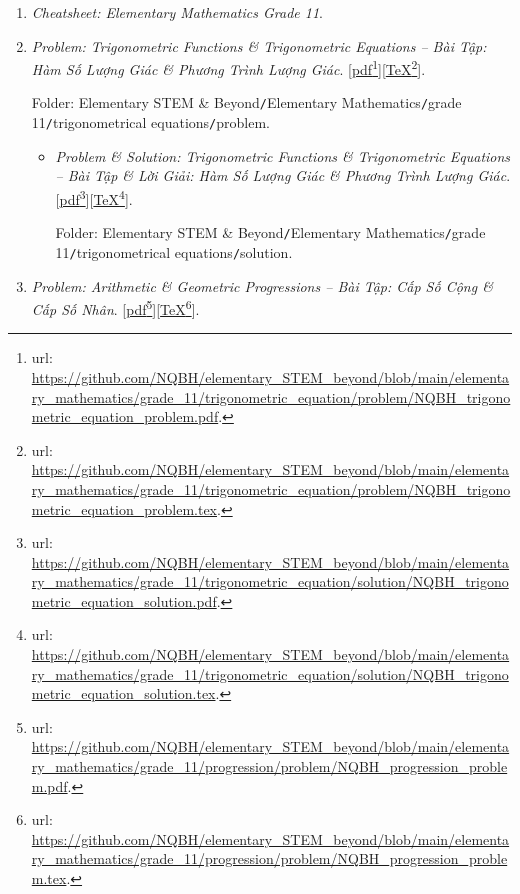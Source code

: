 \documentclass[12pt,twoside]{book}
\begin{document}
\begin{enumerate}
	\item {\it Cheatsheet: Elementary Mathematics Grade 11}.
	
	\item {\it Problem: Trigonometric Functions \& Trigonometric Equations -- Bài Tập: Hàm Số Lượng Giác \& Phương Trình Lượng Giác}. [\href{https://github.com/NQBH/elementary_STEM_beyond/blob/main/elementary_mathematics/grade_11/trigonometric_equation/problem/NQBH_trigonometric_equation_problem.pdf}{pdf}\footnote{{\sc url}: \url{https://github.com/NQBH/elementary_STEM_beyond/blob/main/elementary_mathematics/grade_11/trigonometric_equation/problem/NQBH_trigonometric_equation_problem.pdf}.}][\href{https://github.com/NQBH/elementary_STEM_beyond/blob/main/elementary_mathematics/grade_11/trigonometric_equation/problem/NQBH_trigonometric_equation_problem.tex}{\TeX}\footnote{{\sc url}: \url{https://github.com/NQBH/elementary_STEM_beyond/blob/main/elementary_mathematics/grade_11/trigonometric_equation/problem/NQBH_trigonometric_equation_problem.tex}.}].
	
	Folder: {\sf Elementary STEM \& Beyond{\tt/}Elementary Mathematics{\tt/}grade 11{\tt/}trigonometrical equations{\tt/}problem}.
	\begin{itemize}
		\item {\it Problem \& Solution: Trigonometric Functions \& Trigonometric Equations -- Bài Tập \& Lời Giải: Hàm Số Lượng Giác \& Phương Trình Lượng Giác}. [\href{https://github.com/NQBH/elementary_STEM_beyond/blob/main/elementary_mathematics/grade_11/trigonometric_equation/solution/NQBH_trigonometric_equation_solution.pdf}{pdf}\footnote{{\sc url}: \url{https://github.com/NQBH/elementary_STEM_beyond/blob/main/elementary_mathematics/grade_11/trigonometric_equation/solution/NQBH_trigonometric_equation_solution.pdf}.}][\href{https://github.com/NQBH/elementary_STEM_beyond/blob/main/elementary_mathematics/grade_11/trigonometric_equation/solution/NQBH_trigonometric_equation_solution.tex}{\TeX}\footnote{{\sc url}: \url{https://github.com/NQBH/elementary_STEM_beyond/blob/main/elementary_mathematics/grade_11/trigonometric_equation/solution/NQBH_trigonometric_equation_solution.tex}.}].
		
		Folder: {\sf Elementary STEM \& Beyond{\tt/}Elementary Mathematics{\tt/}grade 11{\tt/}trigonometrical equations{\tt/}solution}.
	\end{itemize}
	\item {\it Problem: Arithmetic \& Geometric Progressions -- Bài Tập: Cấp Số Cộng \& Cấp Số Nhân}. [\href{https://github.com/NQBH/elementary_STEM_beyond/blob/main/elementary_mathematics/grade_11/progression/problem/NQBH_progression_problem.pdf}{pdf}\footnote{{\sc url}: \url{https://github.com/NQBH/elementary_STEM_beyond/blob/main/elementary_mathematics/grade_11/progression/problem/NQBH_progression_problem.pdf}.}][\href{https://github.com/NQBH/elementary_STEM_beyond/blob/main/elementary_mathematics/grade_11/progression/problem/NQBH_progression_problem.tex}{\TeX}\footnote{{\sc url}: \url{https://github.com/NQBH/elementary_STEM_beyond/blob/main/elementary_mathematics/grade_11/progression/problem/NQBH_progression_problem.tex}.}].
	

\end{enumerate}
\end{document}
